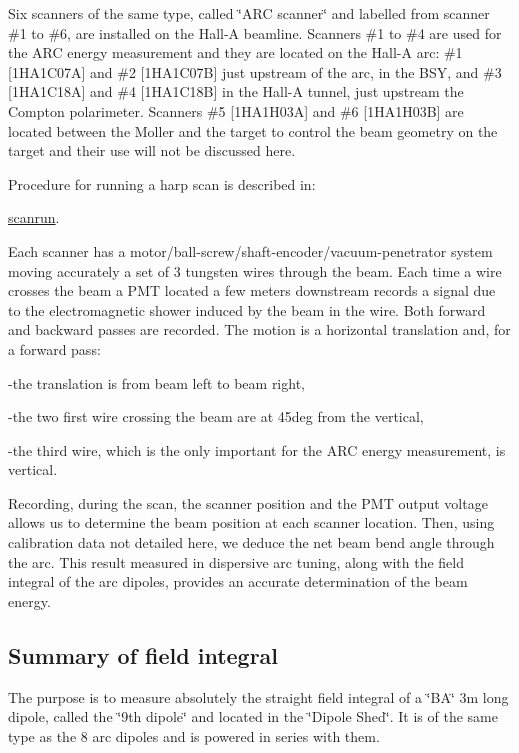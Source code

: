 Six scanners of the same type, called \char`\"{}ARC scanner\char`\"{} and labelled
from scanner \#1 to \#6, are installed on the Hall-A beamline. Scanners \#1
to \#4 are used for the ARC energy measurement and they are located on the Hall-A
arc: \#1 [1HA1C07A] and \#2 [1HA1C07B] just upstream of the arc, in the BSY, and 
\#3 
[1HA1C18A] and \#4 [1HA1C18B] in the Hall-A
tunnel, just upstream the Compton polarimeter. Scanners \#5 [1HA1H03A] and \#6 
[1HA1H03B] 
are located
between the Moller and the target to control the beam geometry on the target
and their use will not be discussed here. 

Procedure for running a harp scan is described in:

\href{http://hallaweb.jlab.org/equipment/beam/harp_halla/harp.html}{scanrun}.


Each scanner has a motor/ball-screw/shaft-encoder/vacuum-penetrator system moving
accurately a set of 3 tungsten wires through the beam. Each time a wire crosses
the beam a PMT located a few meters downstream records a signal due to the 
electromagnetic
shower induced by the beam in the wire. Both forward and backward passes are
recorded. The motion is a horizontal translation and, for a forward pass: 

-the translation is from beam left to beam right, 

-the two first wire crossing the beam are at 45deg from the vertical, 

-the third wire, which is the only important for the ARC energy measurement,
is vertical. 

Recording, during the scan, the scanner position and the PMT output voltage
allows us to determine the beam position at each scanner location. Then, using
calibration data not detailed here, we deduce the net beam bend angle through
the arc. This result measured in dispersive arc tuning, along with the field
integral of the arc dipoles, provides an accurate determination of the beam
energy. 

\vspace{0.3cm}

\subsection{Summary of field integral }

The purpose is to measure absolutely the straight field integral of a 
\char`\"{}BA\char`\"{}
3m long dipole, called the \char`\"{}9th dipole\char`\"{} and located in the
\char`\"{}Dipole Shed\char`\"{}. It is of the same type as the 8 arc dipoles
and is powered in series with them. 

